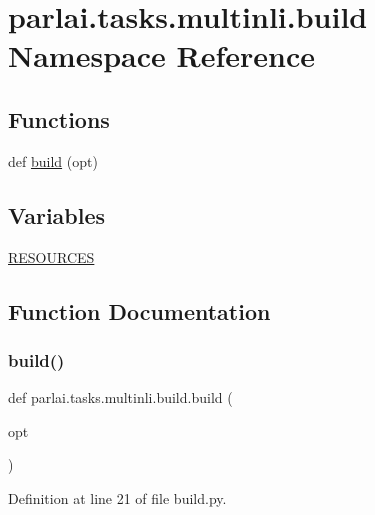 \hypertarget{namespaceparlai_1_1tasks_1_1multinli_1_1build}{}\section{parlai.\+tasks.\+multinli.\+build Namespace Reference}
\label{namespaceparlai_1_1tasks_1_1multinli_1_1build}
\subsection*{Functions}
\begin{DoxyCompactItemize}
\item 
def \hyperlink{namespaceparlai_1_1tasks_1_1multinli_1_1build_a60231d246ac9f217dd74894970a30c27}{build} (opt)
\end{DoxyCompactItemize}
\subsection*{Variables}
\begin{DoxyCompactItemize}
\item 
\hyperlink{namespaceparlai_1_1tasks_1_1multinli_1_1build_ad2155509724ea13b59597b57bfa59bf5}{R\+E\+S\+O\+U\+R\+C\+ES}
\end{DoxyCompactItemize}


\subsection{Function Documentation}
\mbox{\label{namespaceparlai_1_1tasks_1_1multinli_1_1build_a60231d246ac9f217dd74894970a30c27}} 
\subsubsection{\texorpdfstring{build()}{build()}}
{\footnotesize\ttfamily def parlai.\+tasks.\+multinli.\+build.\+build (\begin{DoxyParamCaption}\item[{}]{opt }\end{DoxyParamCaption})}



Definition at line 21 of file build.\+py.


